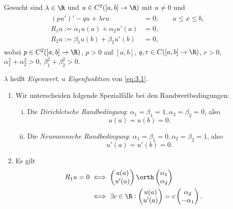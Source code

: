 \begin{df} \label{3.6}
	Gesucht sind $\lambda \in \R$ und $u \in C^2([a,b]\to \R)$ mit $u \neq 0$ und
	\begin{align} \label{eq:3.1}
		\begin{aligned}
		(pu')' - qu + \lambda ru &= 0; \qquad a\le x \le b, \\
		R_1 u := \alpha_1 u(a) + \alpha_2 u'(a) &= 0, \\
		R_2 u := \beta_1 u(b) + \beta_2 u'(b) &= 0,
		\end{aligned}
	\end{align}
	wobei $p \in C^2([a,b] \to \R)$, $p > 0$ auf $[a,b]$, $q,r \in C([a,b] \to \R)$, $r>0$, $\alpha_1^2 + \alpha_2^2 > 0$, $\beta_1^2 + \beta_2^2 > 0$.

	$\lambda$ heißt \emph{Eigenwert}, $u$ \emph{Eigenfunktion} von \eqref{eq:3.1}.
\end{df}

\begin{nt} \label{3.7}
	\begin{enumerate}[1)]
		\item
			Wir unterscheiden folgende Spezialfälle bei den Randwertbedingungen:
			\begin{enumerate}[i)]
				\item
					Die \emph{Dirichletsche Randbedingung}: $\alpha_1 = \beta_1 = 1, \alpha_2 = \beta_2 = 0$, also
					\[
						u(a) = u(b) = 0.
					\]
				\item
					Die \emph{Neumannsche Randbedingung}: $\alpha_1 = \beta_1 = 0, \alpha_2 = \beta_2 = 1$, also
					\[
						u'(a) = u'(b) = 0.
					\]
			\end{enumerate}
		\item
			Es gilt
			\begin{align*}
				R_1 u = 0
				&\iff \begin{pmatrix}
					u(a) \\ u'(a) 
				\end{pmatrix} \orth \begin{pmatrix}
					\alpha_1 \\ \alpha_2
				\end{pmatrix} \\
				&\iff \exists c \in \R : \begin{pmatrix}
					u(a) \\ u'(a)
				\end{pmatrix} = c \begin{pmatrix}
					\alpha_2 \\ -\alpha_1
				\end{pmatrix}.
			\end{align*}


	\end{enumerate}
\end{nt}

